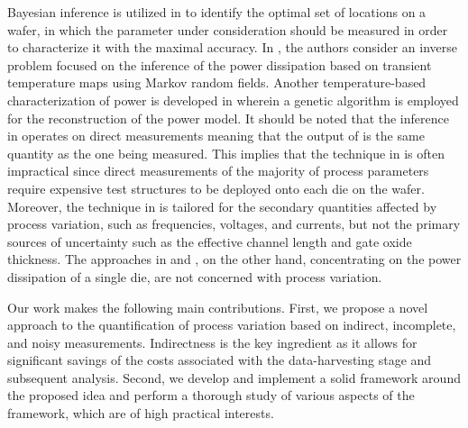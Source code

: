 Bayesian inference is utilized in \cite{zhang2010} to identify the optimal set of locations on a wafer, in which the parameter under consideration should be measured in order to characterize it with the maximal accuracy.
In \cite{paek2012}, the authors consider an inverse problem focused on the inference of the power dissipation based on transient temperature maps using Markov random fields.
Another temperature-based characterization of power is developed in \cite{mesa-martinez2007} wherein a genetic algorithm is employed for the reconstruction of the power model.
It should be noted that the inference in \cite{zhang2010} operates on direct measurements meaning that the output of \cite{zhang2010} is the same quantity as the one being measured.
This implies that the technique in \cite{zhang2010} is often impractical since direct measurements of the majority of process parameters require expensive test structures to be deployed onto each die on the wafer.
Moreover, the technique in \cite{zhang2010} is tailored for the secondary quantities affected by process variation, such as frequencies, voltages, and currents, but not the primary sources of uncertainty such as the effective channel length and gate oxide thickness.
The approaches in \cite{paek2012} and \cite{mesa-martinez2007}, on the other hand, concentrating on the power dissipation of a single die, are not concerned with process variation.

Our work makes the following main contributions.
First, we propose a novel approach to the quantification of process variation based on indirect, incomplete, and noisy measurements.
Indirectness is the key ingredient as it allows for significant savings of the costs associated with the data-harvesting stage and subsequent analysis.
Second, we develop and implement a solid framework around the proposed idea and perform a thorough study of various aspects of the framework, which are of high practical interests.
